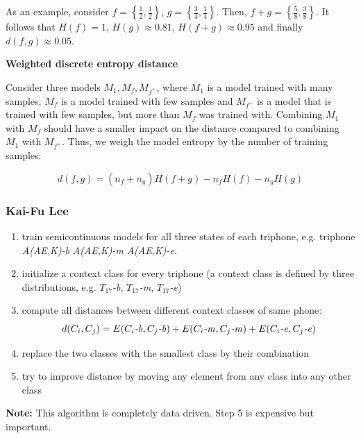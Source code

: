 \documentclass[11pt]{article}
\begin{document}
As an example, consider $f = \left\{\frac{1}{2}, \frac{1}{2} \right\}$, $g = \left\{\frac{3}{4}, \frac{1}{4} \right\}$. Then, $f + g = \left\{\frac{5}{8}, \frac{3}{8} \right\}$. It follows that $H(f) = 1$, $H(g) \approx 0.81$, $H(f + g) \approx 0.95$ and finally $d(f, g) \approx 0.05$.

\vspace{10pt}

\textbf{Weighted discrete entropy distance}

\vspace{5pt}

Consider three models $M_1, M_f, M_{f^+}$, where $M_1$ is a model trained with many samples, $M_f$ is a model trained with few samples and $M_{f^+}$ is a model that is trained with few samples, but more than $M_f$ was trained with. Combining $M_1$ with $M_f$ should have a smaller impact on the distance compared to combining $M_1$ with $M_{f^+}$. Thus, we weigh the model entropy by the number of training samples:

\[
    d(f, g) = (n_f + n_g) H(f + g) - n_f H(f) - n_g H(g)
\]

\subsubsection{Kai-Fu Lee}
\begin{enumerate}
    \item train semicontinuous models for all three states of each triphone, e.g. triphone \textit{A(AE,K)-b} \textit{A(AE,K)-m} \textit{A(AE,K)-e}.
    \item initialize a context class for every triphone (a context class is defined by three distributions, e.g. \textit{$T_{17}$-b}, \textit{$T_{17}$-m}, \textit{$T_{17}$-e})
    \item compute all distances between different context classes of same phone:
        \[
            d(C_i, C_j) = E(C_i\mbox{\textit{-b}}, C_j\mbox{\textit{-b}}) + E(C_i\mbox{\textit{-m}}, C_j\mbox{\textit{-m}}) + E(C_i\mbox{\textit{-e}}, C_j\mbox{\textit{-e}})
        \]
    \item replace the two classes with the smallest class by their combination
    \item try to improve distance by moving any element from any class into any other class
\end{enumerate}

\vspace{10pt}
\textbf{Note:} This algorithm is completely data driven. Step 5 is expensive but important.
\vspace{10pt}
\end{document}
